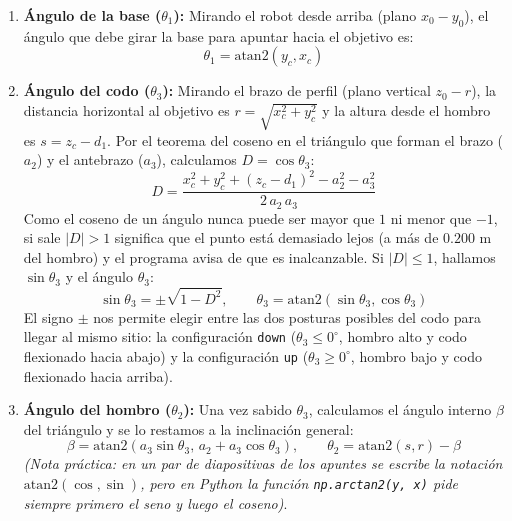 \documentclass[11pt,a4paper]{article}
\begin{document}
\begin{enumerate}
    \item \textbf{Ángulo de la base ($\theta_1$):} Mirando el robot desde arriba (plano $x_0 - y_0$), el ángulo que debe girar la base para apuntar hacia el objetivo es:
    \begin{equation}
        \theta_1 = \text{atan2}(y_c, x_c)
        \label{eq:ci_theta1}
    \end{equation}
    \item \textbf{Ángulo del codo ($\theta_3$):} Mirando el brazo de perfil (plano vertical $z_0 - r$), la distancia horizontal al objetivo es $r = \sqrt{x_c^2 + y_c^2}$ y la altura desde el hombro es $s = z_c - d_1$. Por el teorema del coseno en el triángulo que forman el brazo ($a_2$) y el antebrazo ($a_3$), calculamos $D = \cos\theta_3$:
    \begin{equation}
        D = \frac{x_c^2 + y_c^2 + (z_c - d_1)^2 - a_2^2 - a_3^2}{2\, a_2\, a_3}
        \label{eq:ci_D}
    \end{equation}
    Como el coseno de un ángulo nunca puede ser mayor que $1$ ni menor que $-1$, si sale $|D| > 1$ significa que el punto está demasiado lejos (a más de $0.200\text{ m}$ del hombro) y el programa avisa de que es inalcanzable. Si $|D| \le 1$, hallamos $\sin\theta_3$ y el ángulo $\theta_3$:
    \begin{equation}
        \sin\theta_3 = \pm\sqrt{1 - D^2}, \qquad \theta_3 = \text{atan2}(\sin\theta_3, \cos\theta_3)
        \label{eq:ci_theta3}
    \end{equation}
    El signo $\pm$ nos permite elegir entre las dos posturas posibles del codo para llegar al mismo sitio: la configuración \texttt{down} ($\theta_3 \le 0^\circ$, hombro alto y codo flexionado hacia abajo) y la configuración \texttt{up} ($\theta_3 \ge 0^\circ$, hombro bajo y codo flexionado hacia arriba).
    \item \textbf{Ángulo del hombro ($\theta_2$):} Una vez sabido $\theta_3$, calculamos el ángulo interno $\beta$ del triángulo y se lo restamos a la inclinación general:
    \begin{equation}
        \beta = \text{atan2}\left(a_3\sin\theta_3,\, a_2 + a_3\cos\theta_3\right), \qquad \theta_2 = \text{atan2}(s, r) - \beta
        \label{eq:ci_theta2}
    \end{equation}
    \textit{(Nota práctica: en un par de diapositivas de los apuntes se escribe la notación $\text{atan2}(\cos, \sin)$, pero en Python la función \texttt{np.arctan2(y, x)} pide siempre primero el seno y luego el coseno)}.
\end{enumerate}
\end{document}

